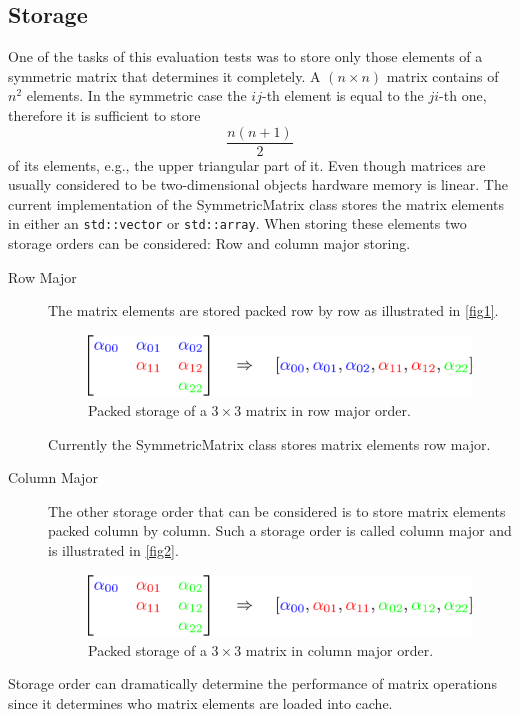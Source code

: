 \documentclass[a4wide]{scrartcl}
\begin{document}
\subsection{Storage}
One of the tasks of this evaluation tests was to store only those elements of a symmetric matrix that determines it completely. A $(n \times n)$ matrix contains of $n^2$ elements. In the symmetric case the $ij$-th element is equal to the $ji$-th one, therefore it is sufficient to store
\[
\frac{n(n+1)}{2}    
\]
of its elements, e.g., the upper triangular part of it. Even though matrices are usually considered to be two-dimensional objects hardware memory is linear. The current implementation of the SymmetricMatrix class stores the matrix elements in either an \texttt{std::vector} or \texttt{std::array}. When storing these elements two storage orders can be considered: Row and column major storing.
\begin{description}
    \item[Row Major] The matrix elements are stored packed row by row as illustrated in \autoref{fig1}.
    \begin{figure}
    \centering
        \includegraphics[scale=0.35]{img/RowMajor.pdf}
        \caption{Packed storage of a $3 \times 3$ matrix in row major order.}
        \label{fig1}
    \end{figure}
    Currently the SymmetricMatrix class stores matrix elements row major.
    \item[Column Major] The other storage order that can be considered is to store matrix elements packed column by column. Such a storage order is called column major and is illustrated in \autoref{fig2}.
    \begin{figure}
    \centering
        \includegraphics[scale=0.35]{img/ColumnMajor.pdf}
        \caption{Packed storage of a $3 \times 3$ matrix in column major order.}
        \label{fig2}
    \end{figure}
\end{description}
Storage order can dramatically determine the performance of matrix operations since it determines who matrix elements are loaded into cache. 
\end{document}
